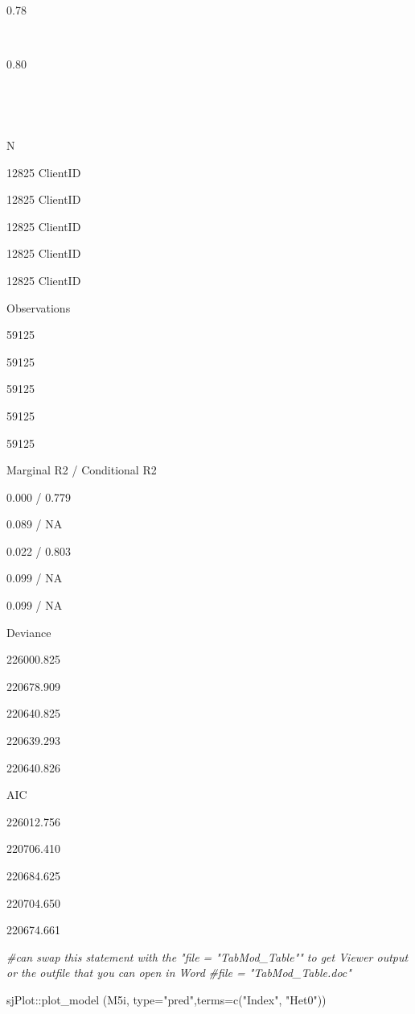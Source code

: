 \documentclass[
  11pt,
]{book}
\newenvironment{Shaded}{\begin{snugshade}}{\end{snugshade}}
\newcommand{\AttributeTok}[1]{\textcolor[rgb]{0.77,0.63,0.00}{#1}}
\newcommand{\CommentTok}[1]{\textcolor[rgb]{0.56,0.35,0.01}{\textit{#1}}}
\newcommand{\FunctionTok}[1]{\textcolor[rgb]{0.00,0.00,0.00}{#1}}
\newcommand{\NormalTok}[1]{#1}
\newcommand{\SpecialCharTok}[1]{\textcolor[rgb]{0.00,0.00,0.00}{#1}}
\newcommand{\StringTok}[1]{\textcolor[rgb]{0.31,0.60,0.02}{#1}}
\begin{document}
0.78

~

0.80

~

~

N

12825 ClientID

12825 ClientID

12825 ClientID

12825 ClientID

12825 ClientID

Observations

59125

59125

59125

59125

59125

Marginal R2 / Conditional R2

0.000 / 0.779

0.089 / NA

0.022 / 0.803

0.099 / NA

0.099 / NA

Deviance

226000.825

220678.909

220640.825

220639.293

220640.826

AIC

226012.756

220706.410

220684.625

220704.650

220674.661

\begin{Shaded}
\begin{Highlighting}[]
\CommentTok{\#can swap this statement with the "file = "TabMod\_Table"" to get Viewer output or the outfile that you can open in Word}
\CommentTok{\#file = "TabMod\_Table.doc"}
\end{Highlighting}
\end{Shaded}

\begin{Shaded}
\begin{Highlighting}[]
\NormalTok{sjPlot}\SpecialCharTok{::}\FunctionTok{plot\_model}\NormalTok{ (M5i, }\AttributeTok{type=}\StringTok{"pred"}\NormalTok{,}\AttributeTok{terms=}\FunctionTok{c}\NormalTok{(}\StringTok{"Index"}\NormalTok{, }\StringTok{"Het0"}\NormalTok{))}
\end{Highlighting}
\end{Shaded}
\end{document}
